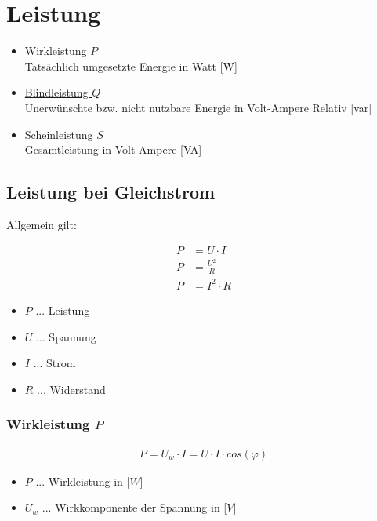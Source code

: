 \chapter{Leistung}
\begin{itemize}
    \item \underline{Wirkleistung $P$} \\
    Tatsächlich umgesetzte Energie in Watt [W]
    \item \underline{Blindleistung $Q$} \\
    Unerwünschte bzw. nicht nutzbare Energie in Volt-Ampere Relativ [var]
    \item \underline{Scheinleistung $S$} \\
    Gesamtleistung in Volt-Ampere [VA]
\end{itemize}

\section{Leistung bei Gleichstrom}
Allgemein gilt:

\begin{align}
    P&=U\cdot I \\
    P&=\frac{U^2}{R} \\
    P&=I^2\cdot R    
\end{align}

\begin{itemize}
    \item $P$ ... Leistung
    \item $U$ ... Spannung
    \item $I$ ... Strom
    \item $R$ ... Widerstand
\end{itemize}

\newpage

\subsection{Wirkleistung $P$}
\begin{align}
    P = U_w \cdot I = U \cdot I \cdot cos(\varphi)
\end{align}
\begin{itemize}
    \item $P$ ... Wirkleistung in [$W$]
    \item $U_w$ ... Wirkkomponente der Spannung in [$V$]
\end{itemize}

